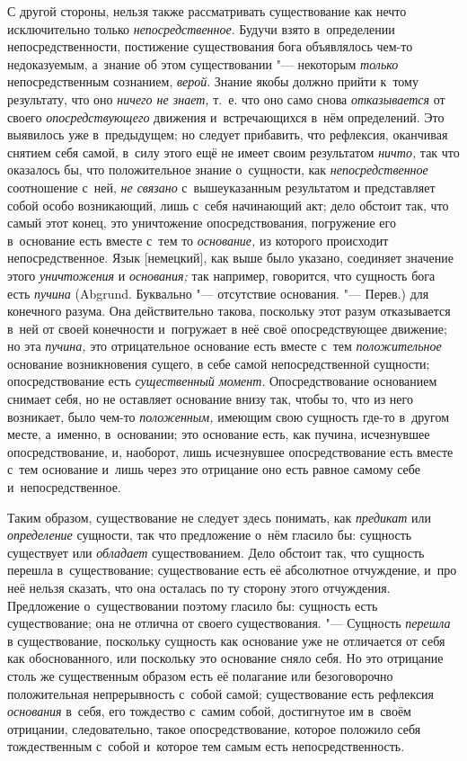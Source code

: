 С другой стороны, нельзя также рассматривать существование как нечто
исключительно только {\em непосредственное}. Будучи
взято в~определении непосредственности, постижение существования бога
объявлялось чем-то недоказуемым, а~знание об этом существовании "--- некоторым
{\em только} непосредственным сознанием,
{\em верой}. Знание якобы должно прийти к~тому
результату, что оно {\em ничего не знает,} т.~е. что
оно само снова {\em отказывается} от своего
{\em опосредствующего} движения и~встречающихся в~нём
определений. Это выявилось уже в~предыдущем; но следует прибавить, что
рефлексия, оканчивая снятием себя самой, в~силу этого ещё не имеет своим
результатом {\em ничто,} так что оказалось бы, что
положительное знание о~сущности, как
{\em непосредственное} соотношение с~ней,
{\em не связано} с~вышеуказанным результатом и
представляет собой особо возникающий, лишь с~себя начинающий акт; дело
обстоит так, что самый этот конец, это уничтожение опосредствования,
погружение его в~основание есть вместе с~тем то
{\em основание,} из которого происходит
непосредственное. Язык [немецкий], как выше было указано, соединяет
значение этого {\em уничтожения} и
{\em основания;} так например, говорится, что сущность
бога есть {\em пучина} (Abgrund. Буквально "--- отсутствие
основания. "--- Перев.) для конечного разума. Она действительно такова,
поскольку этот разум отказывается в~ней от своей конечности и~погружает в
неё своё опосредствующее движение; но эта {\em пучина,}
это отрицательное основание есть вместе с~тем
{\em положительное} основание возникновения сущего, в
себе самой непосредственной сущности; опосредствование есть
{\em существенный момент}. Опосредствование основанием
снимает себя, но не оставляет основание внизу так, чтобы то, что из него
возникает, было чем-то {\em положенным,} имеющим свою
сущность где-то в~другом месте, а~именно, в~основании; это основание есть,
как пучина, исчезнувшее опосредствование, и, наоборот, лишь исчезнувшее
опосредствование есть вместе с~тем основание и~лишь через это отрицание оно
есть равное самому себе и~непосредственное.

Таким образом, существование не следует здесь понимать, как
{\em предикат} или
{\em определение} сущности, так что предложение о~нём
гласило бы: сущность существует или {\em обладает}
существованием. Дело обстоит так, что сущность перешла в~существование;
существование есть её абсолютное отчуждение, и~про неё нельзя сказать, что
она осталась по ту сторону этого отчуждения. Предложение о~существовании
поэтому гласило бы: сущность есть существование; она не отлична от своего
существования. "--- Сущность {\em перешла} в
существование, поскольку сущность как основание уже не отличается от себя
как обоснованного, или поскольку это основание сняло себя. Но это отрицание
столь же существенным образом есть её полагание или безоговорочно
положительная непрерывность с~собой самой; существование есть рефлексия
{\em основания} в~себя, его тождество с~самим собой,
достигнутое им в~своём отрицании, следовательно, такое опосредствование,
которое положило себя тождественным с~собой и~которое тем самым есть
непосредственность.

